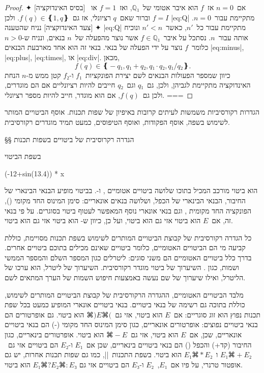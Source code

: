 \begin{proof}
  \mbox{}
  ✦ [בסיס האינדוקציה] אם~$n=0$ אז~$f$ הוא איבר אטומי של~$ℚ₁$,
  ואז~$f=1$ או~$f=I$ וברור שאם~$q$ רציונלי, אז גם~$f(q)∈❴1,q❵$. ולכן
  |eq:Q| מתקיימת עבור~$n=0$.
  ✦ [צעד האינדוקציה] נניח שהטענה |eq:Q| מתקיימת עבור כל~$n'$, כאשר~$n'<n$
  ונוכיח אותה עבור~$n$.
  נסתכל על איבר~$f∈ℚ₁$ אשר נוצר מהפעלה של~$n$ בנאים, ונניח ש-$n>0$ כלומר~$f$
  נוצר על ידי הפעלה של בנאי. בנאי זה הוא אחד מארבעת הבנאים |eq:minus|,
  |eq:plus|, |eq:times|, או |eq:div|.
  מכאן, \[
    f(q)∈❴-q₁,q₁+q₂,q₁·q₂,q₁/q₂❵.
  \] כיוון שמספר הפעולות הבנאים לשם יצירת הפונקציות~$f₁$ ו-$f₂$ קטן ממש מ-$n$
  הנחת האינדוקציה מתקיימת לגביהן, ולכן, גם~$q₁$ וגם~$q₂$ חייבים להיות רציונליים
  אם הם מוגדרים, ולכן גם~$f(q)$, אם הוא מוגדר, חייב להיות מספר רציונלי.
 ===
\end{proof}

הגדרות רקורסיביות משמשות לעיתים קרובות באיפיון של שפות תכנות. אוסף הביטויים
המותר לשימוש בשפה, אוסף הפקודות, ואוסף הטיפוסים, כמעט תמיד מוגדרים רקורסיבית.

§§ הגדרה רקרוסיבית של ביטויים בשפות תכנות

בשפת  הביטוי
\begin{PASCAL}
(-12+sin(13.4)) * x
\end{PASCAL}
הוא ביטוי מורכב המכיל בתוכו שלושה ביטויים אטומיים , 
ו-. בביטוי מופיע הבנאי הבינארי של החיבור, הבנאי הבינארי של הכפל,
ושלושה בנאים אונאריים: סימן המינוס החד מקומי (), הפונקציה החד מקומית
, וגם בנאי אונארי נוסף המאפשר לעטוף ביטוי בסוגרים. על פי בנאי
זה, אם~$E$ הוא ביטוי אזי גם  הוא ביטוי, ועל כן, כיוון
ש- הוא ביטוי אזי גם  הוא ביטוי.

כל הגדרה רקורסיבית של קבוצת הביטויים המותרים לשימוש בשפת תכנות מסויימת, כוללת
קביעה מי הם הביטויים האטומיים, כלומר ביטויים שאינם מכילים בתוכם ביטויים אחרים.
בדרך כלל ביטויים האטומיים הם משני סוגים: ליטרלים כגון המספר השלם  והמספר
הממשי  ושמות, כגון . השיערוך של ביטוי מוגדר רקורסיבית. השיערוך
של ליטרל, הוא ערכו של הליטרל, ואילו שיערוך של שם נעשה באמצעות חיפוש השמות של
הערך המתאים לשם.

מלבד הביטויים האטומיים, ההגדרה הרקורסיבית של קבוצת הביטויים המותרים לשימוש,
כוללת בתוכה גם רשימה של בנאי ביטויים. בנאי ביטויים אונארי המופיע כמעט בכל שפת
תכנות נפוץ הוא זוג סוגריים: אם~$E$ הוא ביטוי, אזי גם~$⌘)E⌘($ הוא ביטוי.
גם אופרטורים הם בנאי ביטויים נפוצים: אופרטורים אונאריים, כגון סימן המינוס החד
מקומי (-) הם בנאי ביטויים אונאריים, שכן, אם~$E$ הוא ביטוי,
אזי גם~$⌘-E$ הוא ביטוי. אופרטורים בינאריים, כגון החיבור (קד+) והכפל () הם
בנאי ביטויים בינאריים, שכן אם~$E₁$ ו-$E₂$ הם ביטויים אזי גם~$E₁⌘+E₂$
ו~$E₁⌘*E₂$ הוא ביטוי. בשפת התכנות~\E|\CPL|, כמו גם שפות תכנות אחרות, יש גם
אופטור טרנרי, על פיו אם~$E₁$,~$E₂$ ו-$E₃$ הם ביטויים אזי גם
$E₁⌘?E₂⌘:E₃$ הוא ביטוי.


